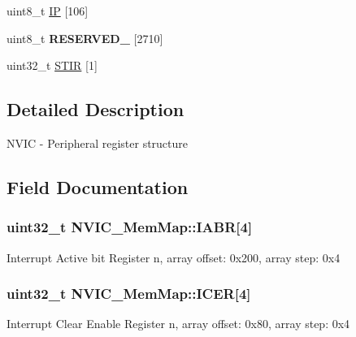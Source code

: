 \begin{DoxyCompactItemize}
\item 
uint8\+\_\+t \hyperlink{struct_n_v_i_c___mem_map_a2c1a78a8c4dc2c05595641b28e771dee}{I\+P} \mbox{[}106\mbox{]}
\item 
\hypertarget{struct_n_v_i_c___mem_map_a15bcaf2702d7c14e869fefc29a56da5d}{}uint8\+\_\+t {\bfseries R\+E\+S\+E\+R\+V\+E\+D\+\_} \mbox{[}2710\mbox{]}\label{struct_n_v_i_c___mem_map_a15bcaf2702d7c14e869fefc29a56da5d}

\item 
uint32\+\_\+t \hyperlink{struct_n_v_i_c___mem_map_a417658a729224de65052153f5c2cc419}{S\+T\+I\+R} \mbox{[}1\mbox{]}
\end{DoxyCompactItemize}


\subsection{Detailed Description}
N\+V\+I\+C -\/ Peripheral register structure 

\subsection{Field Documentation}
\hypertarget{struct_n_v_i_c___mem_map_ac2813e9c133793584e82f645f7e5c2ad}{}
\subsubsection[{I\+A\+B\+R}]{\setlength{\rightskip}{0pt plus 5cm}uint32\+\_\+t N\+V\+I\+C\+\_\+\+Mem\+Map\+::\+I\+A\+B\+R\mbox{[}4\mbox{]}}\label{struct_n_v_i_c___mem_map_ac2813e9c133793584e82f645f7e5c2ad}
Interrupt Active bit Register n, array offset\+: 0x200, array step\+: 0x4 \hypertarget{struct_n_v_i_c___mem_map_a44632f5cb66efc81e73970988a899334}{}
\subsubsection[{I\+C\+E\+R}]{\setlength{\rightskip}{0pt plus 5cm}uint32\+\_\+t N\+V\+I\+C\+\_\+\+Mem\+Map\+::\+I\+C\+E\+R\mbox{[}4\mbox{]}}\label{struct_n_v_i_c___mem_map_a44632f5cb66efc81e73970988a899334}
Interrupt Clear Enable Register n, array offset\+: 0x80, array step\+: 0x4 \hypertarget{struct_n_v_i_c___mem_map_a18f7154bcaf967d002d2cb1bd480a66a}{}
